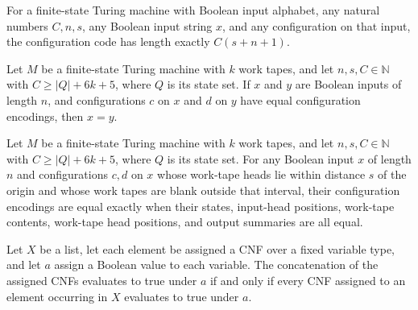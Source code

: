 \begin{theorem}
\label{Complexity.configurationCodec_length}
\leanok
{}
For a finite-state Turing machine with Boolean input alphabet, any natural numbers
$C,n,s$, any Boolean input string $x$, and any configuration on that input, the
configuration code has length exactly $C(s+n+1)$.
\end{theorem}

\begin{theorem}
\label{Complexity.configurationCodec_input_eq}
\leanok
{}
Let $M$ be a finite-state Turing machine with $k$ work tapes, and let $n,s,C\in\mathbb
N$ with $C\ge |Q|+6k+5$, where $Q$ is its state set. If $x$ and $y$ are Boolean inputs
of length $n$, and configurations $c$ on $x$ and $d$ on $y$ have equal configuration
encodings, then $x=y$.
\end{theorem}

\begin{theorem}
\label{Complexity.configurationCodec_eq_iff}
\leanok
{}
Let $M$ be a finite-state Turing machine with $k$ work tapes, and let $n,s,C\in\mathbb
N$ with $C\ge |Q|+6k+5$, where $Q$ is its state set. For any Boolean input $x$ of length
$n$ and configurations $c,d$ on $x$ whose work-tape heads lie within distance $s$ of the
origin and whose work tapes are blank outside that interval, their configuration
encodings are equal exactly when their states, input-head positions, work-tape contents,
work-tape head positions, and output summaries are all equal.
\end{theorem}

\begin{theorem}
\label{Complexity.codecCnf_eval_flatMap}
\leanok
{}
Let $X$ be a list, let each element be assigned a CNF over a fixed variable type, and
let $a$ assign a Boolean value to each variable. The concatenation of the assigned CNFs
evaluates to true under $a$ if and only if every CNF assigned to an element occurring in
$X$ evaluates to true under $a$.
\end{theorem}

